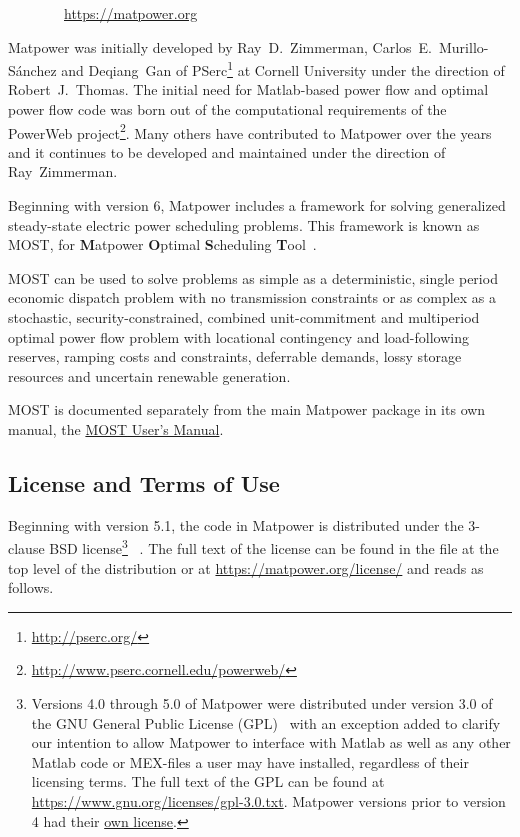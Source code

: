 \documentclass[12pt]{article}
\newcommand{\matlab}[0]{{\sc Matlab}}
\newcommand{\matpower}[0]{{\sc Matpower}}
\newcommand{\matpowerurl}[0]{https://matpower.org}
\newcommand{\most}[0]{{MOST}}
\newcommand{\mostname}[0]{{{\bf M}{\sc atpower} \textbf{O}ptimal \textbf{S}cheduling \textbf{T}ool}}
\newcommand{\mostver}[0]{1.3.1}
\newcommand{\pserc}[0]{{\sc PSerc}}
\newcommand{\code}[1]{{\relsize{-0.5}{\tt{{#1}}}}}  %
\newcommand{\mostmanurl}[0]{https://matpower.org/docs/MOST-manual-\mostver.pdf}
\newcommand{\mostman}[0]{\href{\mostmanurl}{\most{} User's Manual}}
\numberwithin{equation}{section}
\numberwithin{table}{section}
\numberwithin{figure}{section}
\begin{document}
\bigskip

~~~~~~~~\url{\matpowerurl}

\bigskip

\matpower{} was initially developed by Ray~D.~Zimmerman, Carlos~E.~Murillo-S\'anchez and Deqiang~Gan of \pserc{}\footnote{\url{http://pserc.org/}} at Cornell University under the direction of Robert~J.~Thomas. The initial need for \matlab{}-based power flow and optimal power flow code was born out of the computational requirements of the PowerWeb project\footnote{\url{http://www.pserc.cornell.edu/powerweb/}}. Many others have contributed to \matpower{} over the years and it continues to be developed and maintained under the direction of Ray~Zimmerman.

Beginning with version 6, \matpower{} includes a framework for solving generalized steady-state electric power scheduling problems. This framework is known as \most{}, for \mostname{}~\cite{murillo-sanchez2013a,lamadrid2018}.

\most{} can be used to solve problems as simple as a deterministic, single period economic dispatch problem with no transmission constraints or as complex as a stochastic, security-constrained, combined unit-commitment and multiperiod optimal power flow problem with locational contingency and load-following reserves, ramping costs and constraints, deferrable demands, lossy storage resources and uncertain renewable generation.

\most{} is documented separately from the main \matpower{} package in its own manual, the \mostman{}.

\pagebreak
\subsection{License and Terms of Use}

Beginning with version 5.1, the code in \matpower{} is distributed under the 3-clause BSD license\footnote{Versions 4.0 through 5.0 of \matpower{} were distributed under version 3.0 of the GNU General Public License (GPL)~\cite{gpl} with an exception added to clarify our intention to allow \matpower{} to interface with \matlab{} as well as any other \matlab{} code or MEX-files a user may have installed, regardless of their licensing terms. The full text of the GPL can be found at \url{https://www.gnu.org/licenses/gpl-3.0.txt}. \matpower{} versions prior to version 4 had their \href{https://matpower.org/license/old}{own license}.}
~\cite{bsd}. The full text of the license can be found in the \code{LICENSE} file at the top level of the distribution or at \url{https://matpower.org/license/} and reads as follows.
\end{document}
